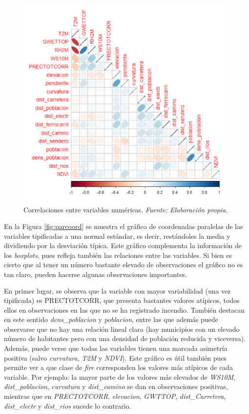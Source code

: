 \documentclass[12pt,a4paper,]{book}
\numberwithin{dummy}{section}
\theoremstyle{ocrenumbox}
\theoremstyle{blacknumex}
\theoremstyle{blacknumbox}
\theoremstyle{ocrenum}
\theoremstyle{ocrenum}
\begin{document}
\begin{figure}[h]
\centering
\includegraphics[width =\textwidth]{graficos/corrplot.png}
\caption{Correlaciones entre variables numéricas. \it Fuente: Elaboración propia.}
\label{fig:corrplot}
\end{figure}

En la Figura \ref{fig:parcoord} se muestra el gráfico de coordenadas
paralelas de las variables tipificadas a una normal estándar, es decir,
restándoles la media y dividiendo por la desviación típica. Este gráfico
complementa la información de los \emph{boxplots}, pues refleja también
las relaciones entre las variables. Si bien es cierto que al tener un
número bastante elevado de observaciones el gráfico no es tan claro,
pueden hacerse algunas observaciones importantes.

En primer lugar, se observa que la variable con mayor variabilidad (una
vez tipificada) es PRECTOTCORR, que presenta bastantes valores atípicos,
todos ellos en observaciones en las que no se ha registrado incendio.
También destacan en este sentido \emph{dens\_poblacion} y
\emph{poblacion}, entre las que además puede observarse que no hay una
relación lineal clara (hay municipios con un elevado número de
habitantes pero con una densidad de población reducida y viceversa).
Además, puede verse que todas las variables tienen una marcada asimetría
positiva (salvo \emph{curvatura}, \emph{T2M} y \emph{NDVI}). Este
gráfico es útil también pues permite ver a que clase de \emph{fire}
corresponden los valores más atípicos de cada variable. Por ejemplo: la
mayor parte de los valores más elevados de \emph{WS10M},
\emph{dist\_poblacion}, \emph{curvatura} y \emph{dist\_camino} se dan en
observaciones positivas, mientras que en \emph{PRECTOTCORR},
\emph{elevacion}, \emph{GWTTOP}, \emph{dist\_Carretera},
\emph{dist\_electr} y \emph{dist\_rios} sucede lo contrario.
\end{document}
